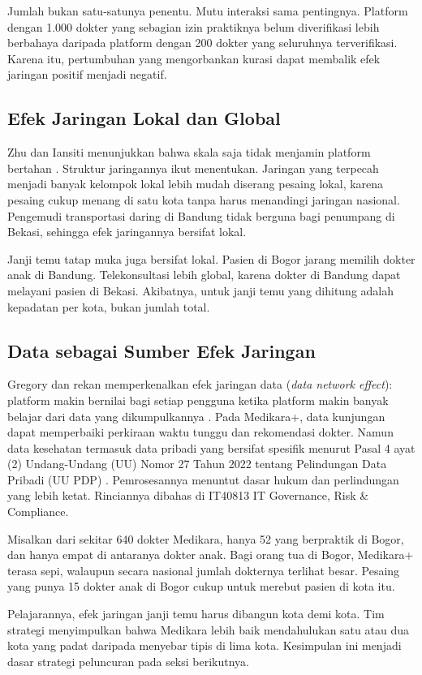 Jumlah bukan satu-satunya penentu. Mutu interaksi sama pentingnya. Platform
dengan 1.000 dokter yang sebagian izin praktiknya belum diverifikasi lebih
berbahaya daripada platform dengan 200 dokter yang seluruhnya terverifikasi.
Karena itu, pertumbuhan yang mengorbankan kurasi dapat membalik efek jaringan
positif menjadi negatif.

\subsection{Efek Jaringan Lokal dan Global}

Zhu dan Iansiti menunjukkan bahwa skala saja tidak menjamin platform bertahan
\cite{c02-zhu2019platforms}. Struktur jaringannya ikut menentukan. Jaringan
yang terpecah menjadi banyak kelompok lokal lebih mudah diserang pesaing lokal,
karena pesaing cukup menang di satu kota tanpa harus menandingi jaringan
nasional. Pengemudi transportasi daring di Bandung tidak berguna bagi penumpang
di Bekasi, sehingga efek jaringannya bersifat lokal.

Janji temu tatap muka juga bersifat lokal. Pasien di Bogor jarang memilih dokter
anak di Bandung. Telekonsultasi lebih global, karena dokter di Bandung dapat
melayani pasien di Bekasi. Akibatnya, untuk janji temu yang dihitung adalah
kepadatan per kota, bukan jumlah total.

\subsection{Data sebagai Sumber Efek Jaringan}

Gregory dan rekan memperkenalkan efek jaringan data (\textit{data network
effect}): platform makin bernilai bagi setiap pengguna ketika platform makin
banyak belajar dari data yang dikumpulkannya \cite{c02-gregory2021data}. Pada
Medikara+, data kunjungan dapat memperbaiki perkiraan waktu tunggu dan
rekomendasi dokter. Namun data kesehatan termasuk data pribadi yang bersifat
spesifik menurut Pasal 4 ayat (2) Undang-Undang (UU) Nomor 27 Tahun 2022 tentang
Pelindungan Data Pribadi (UU PDP) \cite{uu27-2022-pdp}. Pemrosesannya menuntut
dasar hukum dan perlindungan yang lebih ketat. Rinciannya dibahas di IT40813 IT
Governance, Risk \& Compliance.

\begin{kasus}[title={Kasus Medikara Health: Lima Kota, Lima Jaringan Kecil}]
Misalkan dari sekitar 640 dokter Medikara, hanya 52 yang berpraktik di Bogor, dan hanya
empat di antaranya dokter anak. Bagi orang tua di Bogor, Medikara+ terasa sepi,
walaupun secara nasional jumlah dokternya terlihat besar. Pesaing yang punya 15
dokter anak di Bogor cukup untuk merebut pasien di kota itu.

Pelajarannya, efek jaringan janji temu harus dibangun kota demi kota. Tim
strategi menyimpulkan bahwa Medikara lebih baik mendahulukan satu atau dua kota
yang padat daripada menyebar tipis di lima kota. Kesimpulan ini menjadi dasar
strategi peluncuran pada seksi berikutnya.
\end{kasus}

